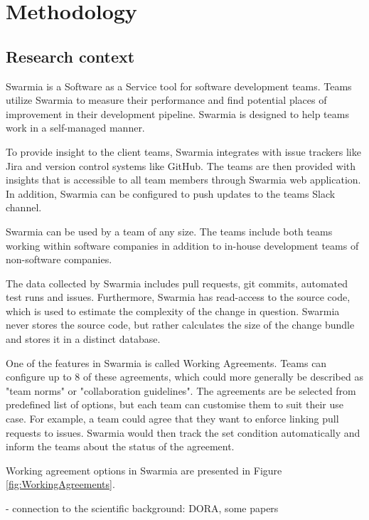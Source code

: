 
\chapter{Methodology}

\section{Research context}

Swarmia is a Software as a Service tool for software development teams. Teams utilize Swarmia to measure their performance and find potential places of improvement in their development pipeline. Swarmia is designed to help teams work in a self-managed manner. 

To provide insight to the client teams, Swarmia integrates with issue trackers like Jira and version control systems like GitHub. The teams are then provided with insights that is accessible to all team members through Swarmia web application. In addition, Swarmia can be configured to push updates to the teams Slack channel. 

Swarmia can be used by a team of any size. The teams include both teams working within software companies in addition to in-house development teams of non-software companies. 

The data collected by Swarmia includes pull requests, git commits, automated test runs and issues. Furthermore, Swarmia has read-access to the source code, which is used to estimate the complexity of the change in question. Swarmia never stores the source code, but rather calculates the size of the change bundle and stores it in a distinct database. 

One of the features in Swarmia is called Working Agreements. Teams can configure up to 8 of these agreements, which could more generally be described as "team norms" or "collaboration guidelines". The agreements are be selected from predefined list of options, but each team can customise them to suit their use case. For example, a team could agree that they want to enforce linking pull requests to issues. Swarmia would then track the set condition automatically and inform the teams about the status of the agreement. 

Working agreement options in Swarmia are presented in Figure \ref{fig:WorkingAgreements}.



- connection to the scientific background: DORA, some papers

